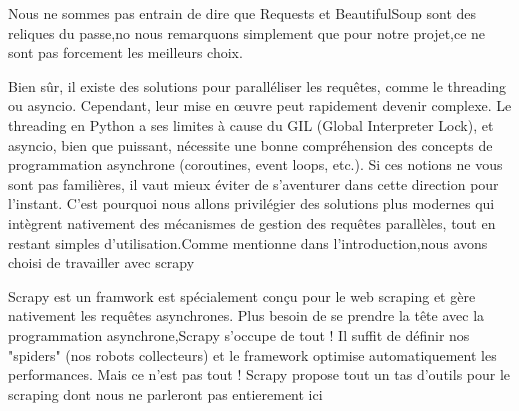 \documentclass[small]{zmdocument}
\begin{document}
\begin{Information}
Nous ne sommes pas entrain de dire que Requests et BeautifulSoup sont des reliques du passe,no nous remarquons simplement que pour notre projet,ce ne sont pas forcement les meilleurs choix.
\end{Information}
Bien sûr, il existe des solutions pour paralléliser les requêtes, comme le threading ou asyncio. Cependant, leur mise en œuvre peut rapidement devenir complexe. Le threading en Python a ses limites à cause du GIL (Global Interpreter Lock), et asyncio, bien que puissant, nécessite une bonne compréhension des concepts de programmation asynchrone (coroutines, event loops, etc.). Si ces notions ne vous sont pas familières, il vaut mieux éviter de s'aventurer dans cette direction pour l'instant.
C'est pourquoi nous allons privilégier des solutions plus modernes qui intègrent nativement des mécanismes de gestion des requêtes parallèles, tout en restant simples d'utilisation.Comme mentionne dans l'introduction,nous avons choisi de travailler avec scrapy

Scrapy est un framwork est spécialement conçu pour le web scraping et  gère nativement les requêtes asynchrones. Plus besoin de se prendre la tête avec la programmation asynchrone,Scrapy s'occupe de tout ! Il suffit de définir nos "spiders" (nos robots collecteurs) et le framework optimise automatiquement les performances.
Mais ce n'est pas tout ! Scrapy propose tout un tas d'outils pour le scraping dont nous ne parleront pas entierement ici
\end{document}

